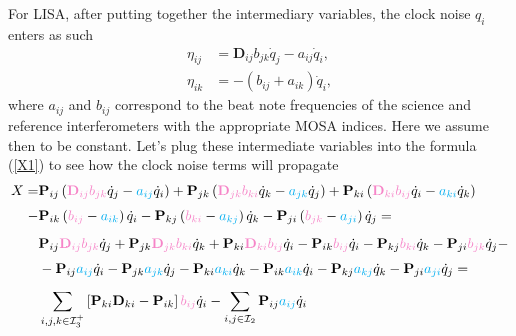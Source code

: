 \documentclass[11pt]{article}
\begin{document}
For LISA, after putting together the intermediary variables, the clock noise $q_i$ enters as such
\begin{align*}
    \eta_{ij}&=\mathbf{D}_{ij}b_{jk}\dot{q}_j-a_{ij}\dot{q}_i,\\
    \eta_{ik}&=-\left(b_{ij}+a_{ik}\right)\dot{q}_i,
\end{align*}
where $ a _ {ij} $ and $ b _ {ij} $ correspond to the beat note frequencies of the science and reference interferometers with the appropriate MOSA indices. Here we assume then to be constant. Let's plug these intermediate variables into the formula (\ref{X1}) to see how the clock noise terms will propagate
\begin{align}
    \nonumber X=&\mathbf{P}_{ij}\left(\color{Lavender}\mathbf{D}_{ij}b_{jk}\color{black}\dot{q}_j-\color{cyan}a_{ij}\color{black}\dot{q}_i\right)+
    \mathbf{P}_{jk}\left(\color{Lavender}\mathbf{D}_{jk}b_{ki}\color{black}\dot{q}_k-\color{cyan}a_{jk}\color{black}\dot{q}_j\right)+
    \mathbf{P}_{ki}\left(\color{Lavender}\mathbf{D}_{ki}b_{ij}\color{black}\dot{q}_i-\color{cyan}a_{ki}\color{black}\dot{q}_k\right)\\[3pt]\nonumber
    -&\mathbf{P}_{ik}\left(\color{Lavender}b_{ij}\color{black}-\color{cyan}a_{ik}\color{black}\right)\dot{q}_i-
    \mathbf{P}_{kj}\left(\color{Lavender}b_{ki}\color{black}-\color{cyan}a_{kj}\color{black}\right)\dot{q}_k-
    \mathbf{P}_{ji}\left(\color{Lavender}b_{jk}\color{black}-\color{cyan}a_{ji}\color{black}\right)\dot{q}_j=\\[5pt]\nonumber
    &\mathbf{P}_{ij}\color{Lavender}\mathbf{D}_{ij}b_{jk}\color{black}\dot{q}_j+\mathbf{P}_{jk}\color{Lavender}\mathbf{D}_{jk}b_{ki}\color{black}\dot{q}_k+\mathbf{P}_{ki}\color{Lavender}\mathbf{D}_{ki}b_{ij}\color{black}\dot{q}_i-\mathbf{P}_{ik}\color{Lavender}b_{ij}\color{black}\dot{q}_i-\mathbf{P}_{kj}\color{Lavender}b_{ki}\color{black}\dot{q}_k-\mathbf{P}_{ji}\color{Lavender}b_{jk}\color{black}\dot{q}_j-\\[3pt]\nonumber
    &-\mathbf{P}_{ij}\color{cyan}a_{ij}\color{black}\dot{q}_i-\mathbf{P}_{jk}\color{cyan}a_{jk}\color{black}\dot{q}_j-\mathbf{P}_{ki}\color{cyan}a_{ki}\color{black}\dot{q}_k-\mathbf{P}_{ik}\color{cyan}a_{ik}\color{black}\dot{q}_i-\mathbf{P}_{kj}\color{cyan}a_{kj}\color{black}\dot{q}_k-\mathbf{P}_{ji}\color{cyan}a_{ji}\color{black}\dot{q}_j=\\[5pt]
    &\sum_{i,j,k\in\mathcal{I}^+_3}\left[\mathbf{P}_{ki}\mathbf{D}_{ki}-\mathbf{P}_{ik}\right]\color{Lavender}b_{ij}\color{black}\dot{q}_i-\sum_{i,j\in\mathcal{I}_2}\mathbf{P}_{ij}\color{cyan}a_{ij}\color{black}\dot{q}_i\label{TDI formula}
\end{align}
\end{document}
